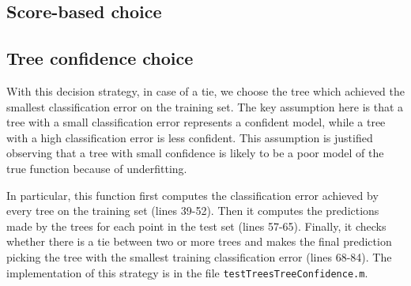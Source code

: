 \documentclass{article}
\begin{document}
\subsection{Score-based choice}

\subsection{Tree confidence choice}
With this decision strategy, in case of a tie, we choose the tree which achieved the smallest classification error on the training set. The key assumption here is that a tree with a small classification error represents a confident model, while a tree with a high classification error is less confident. This assumption is justified observing that a tree with small confidence is likely to be a poor model of the true function because of underfitting. 

In particular, this function first computes the classification error achieved by every tree on the training set (lines 39-52). Then it computes the predictions made by the trees for each point in the test set (lines 57-65). Finally, it checks whether there is a tie between two or more trees and makes the final prediction picking the tree with the smallest training classification error (lines 68-84). The implementation of this strategy is in the file \verb$testTreesTreeConfidence.m$.
\end{document}
